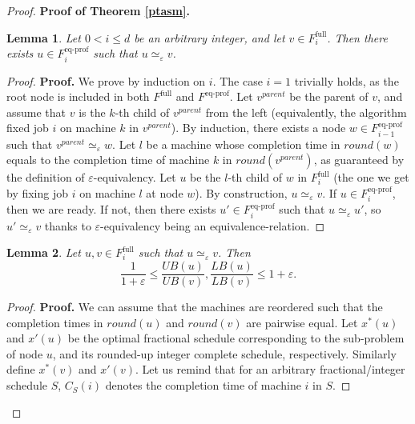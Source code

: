 \documentclass[moor,sglanonrev]{informs4}
\theoremstyle{plain}
\newtheorem{lmm}{Lemma}  %
\begin{document}
\begin{proof}{\textbf{Proof of Theorem \ref{ptasm}.}}
    \begin{lmm}\label{repet}
        Let $0 < i \le d$ be an arbitrary integer, and let $v\in F^{\text{full}}_i$. Then there exists $u \in F^{\text{eq-prof}}_i$ such that $u \simeq_{\varepsilon} v$.
    \end{lmm}

    \begin{proof}{\textbf{Proof.}}
        We prove by induction on $i$. The case $i=1$ trivially holds, as the root node is included in both $F^{\text{full}}$ and $F^{\text{eq-prof}}$. Let $v^{parent}$ be the parent of $v$, and assume that $v$ is the $k$-th child of $v^{parent}$ from the left (equivalently, the algorithm fixed job $i$ on machine $k$ in $v^{parent}$). By induction, there exists a node $w \in F^{\text{eq-prof}}_{i-1}$ such that $v^{parent} \simeq_{\varepsilon} w$. Let $l$ be a machine whose completion time in $round(w)$ equals to the completion time of machine $k$ in $round(v^{parent})$, as guaranteed by the definition of $\varepsilon$-equivalency. Let $u$ be the $l$-th child of $w$ in $F^{\text{full}}_i$ (the one we get by fixing job $i$ on machine $l$ at node $w$). By construction, $u \simeq_{\varepsilon} v$. If $u\in F^{\text{eq-prof}}_i$, then we are ready. If not, then there exists $u' \in F^{\text{eq-prof}}_i$ such that $u \simeq_{\varepsilon} u'$, so $u' \simeq_{\varepsilon} v$ thanks to $\varepsilon$-equivalency being an equivalence-relation. \hfill \Halmos
    \end{proof}

    \begin{lmm}\label{equal_lb}
        Let $u, v \in F^{\text{full}}_i$ such that $u \simeq_{\varepsilon} v$. Then 
        \[
        \frac{1}{1+\varepsilon} \le \frac{UB(u)}{UB(v)}, \frac{LB(u)}{LB(v)}\le 1+\varepsilon.
        \]
    \end{lmm}

    \begin{proof}{\textbf{Proof.}}
        We can assume that the machines are reordered such that the completion times in $round(u)$ and $round(v)$ are pairwise equal. Let $x^*(u)$ and $x'(u)$ be the optimal fractional schedule corresponding to the sub-problem of node $u$, and its rounded-up integer complete schedule, respectively. Similarly define $x^*(v)$ and $x'(v)$. Let us remind that for an arbitrary fractional/integer schedule $S$, $C_S(i)$ denotes the completion time of machine $i$ in $S$.


\end{proof}
\end{proof}
\end{document}
